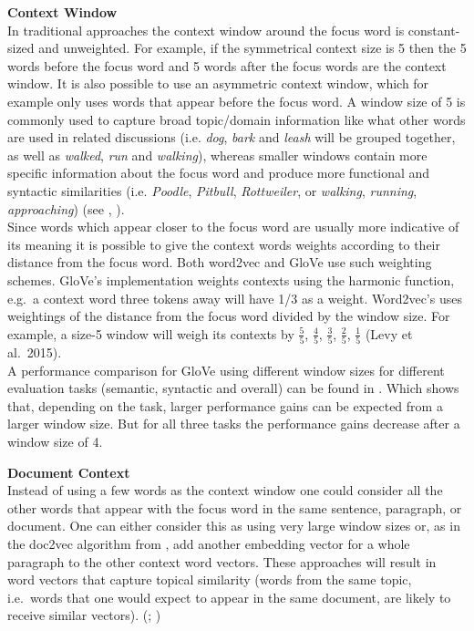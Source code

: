 \documentclass[]{krantz}
\begin{document}
\textbf{Context Window}\\
In traditional approaches the context window around the focus word is constant-sized and unweighted. For example, if the symmetrical context size is 5 then the 5 words before the focus word and 5 words after the focus words are the context window. It is also possible to use an asymmetric context window, which for example only uses words that appear before the focus word. A window size of 5 is commonly used to capture broad topic/domain information like what other words are used in related discussions (i.e. \emph{dog}, \emph{bark} and \emph{leash} will be grouped together, as well as \emph{walked}, \emph{run} and \emph{walking}), whereas smaller windows contain more specific information about the focus word and produce more functional and syntactic similarities (i.e. \emph{Poodle}, \emph{Pitbull}, \emph{Rottweiler}, or \emph{walking}, \emph{running}, \emph{approaching}) (see \citet{goldberg2014word2vec}, \citet{goldberg2016primer}).\\
Since words which appear closer to the focus word are usually more indicative of its meaning it is possible to give the context words weights according to their distance from the focus word. Both word2vec and GloVe use such weighting schemes. GloVe's implementation weights contexts using the harmonic function, e.g.~a context word three tokens away will have 1/3 as a weight. Word2vec's uses weightings of the distance from the focus word divided by the window size. For example, a size-5 window will weigh its contexts by \(\frac {5}{5}\), \(\frac {4}{5}\), \(\frac {3}{5}\), \(\frac {2}{5}\), \(\frac {1}{5}\) (Levy et al.~2015).\\
A performance comparison for GloVe using different window sizes for different evaluation tasks (semantic, syntactic and overall) can be found in \citet{Pennington.2014}. Which shows that, depending on the task, larger performance gains can be expected from a larger window size. But for all three tasks the performance gains decrease after a window size of 4.

\textbf{Document Context}\\
Instead of using a few words as the context window one could consider all the other words that appear with the focus word in the same sentence, paragraph, or document. One can either consider this as using very large window sizes or, as in the doc2vec algorithm from \citet{le2014distributed}, add another embedding vector for a whole paragraph to the other context word vectors. These approaches will result in word vectors that capture topical similarity (words from the same topic, i.e.~words that one would expect to appear in the same document, are likely to receive similar vectors). (\citet{goldberg2016primer}; \citet{le2014distributed})
\end{document}
